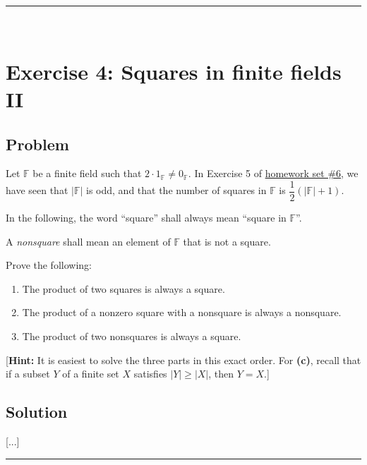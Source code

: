\documentclass[paper=a4, fontsize=12pt]{scrartcl} %
\newcommand{\FF}{\mathbb{F}} %
\newcommand{\abs}[1]{\left| #1 \right|}
\newcommand{\tup}[1]{\left( #1 \right)}
\newcommand{\horrule}[1]{\rule{\linewidth}{#1}} %
\theoremstyle{plainsl}
\theoremstyle{definition}
\theoremstyle{remark}
\begin{document}
\horrule{0.3pt} \\[0.4cm]

\section{Exercise 4: Squares in finite fields II}

\subsection{Problem}

Let $\FF$ be a finite field such that
$2 \cdot 1_{\FF} \neq 0_{\FF}$.
In Exercise 5 of
\href{http://www.cip.ifi.lmu.de/~grinberg/t/19s/hw6s.pdf}{homework set \#6},
we have seen that
$\abs{\FF}$ is odd, and that the number of squares in $\FF$ is
$\dfrac{1}{2} \tup{ \abs{\FF} + 1 }$.

In the following, the word ``square'' shall always mean
``square in $\FF$''.

A \textit{nonsquare} shall mean an element of $\FF$ that is not
a square.

Prove the following:

\begin{enumerate}

\item[\textbf{(a)}]
The product of two squares is always a square.

\item[\textbf{(b)}]
The product of a nonzero square with a nonsquare is always
a nonsquare.

\item[\textbf{(c)}]
The product of two nonsquares is always a square.

\end{enumerate}

[\textbf{Hint:} It is easiest to solve the three parts in
this exact order.
For \textbf{(c)}, recall that if a subset
$Y$ of a finite set $X$ satisfies $\abs{Y} \geq \abs{X}$,
then $Y = X$.]

\subsection{Solution}

[...]

\horrule{0.3pt} \\[0.4cm]
\end{document}
